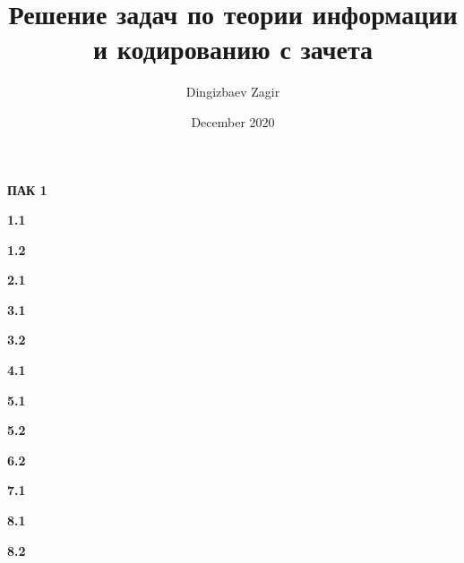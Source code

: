 \documentclass[a4paper,10pt]{article}
\title{Решение задач по теории информации и кодированию с зачета}
\author{Dingizbaev Zagir}
\date{December 2020}
\begin{document}


\begin{center}
    \textbf{\LARGE ПАК 1}
\end{center}

\setlength{\parskip}{1em}
\begin{center}
    \textbf{\large 1.1}
\end{center}


\begin{center}
    \textbf{\large 1.2}
\end{center}


\begin{center}
    \textbf{\large 2.1}
\end{center}


\begin{center}
    \textbf{\large 3.1}
\end{center}


\begin{center}
    \textbf{\large 3.2}
\end{center}


\newpage
\begin{center}
    \textbf{\large 4.1}
\end{center}


\begin{center}
    \textbf{\large 5.1}
\end{center}


\begin{center}
    \textbf{\large 5.2}
\end{center}


\newpage
\begin{center}
    \textbf{\large 6.2}
\end{center}


\begin{center}
    \textbf{\large 7.1}
\end{center}


\begin{center}
    \textbf{\large 8.1}
\end{center}


\begin{center}
    \textbf{\large 8.2}
\end{center}

\end{document}
